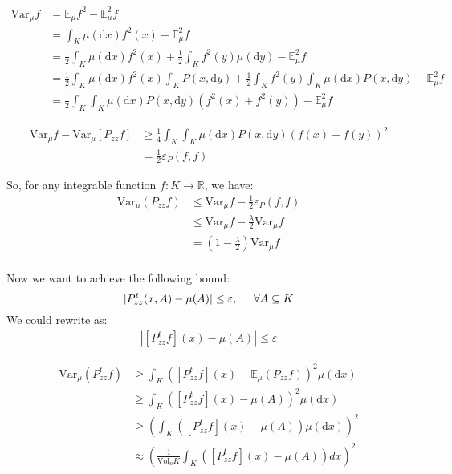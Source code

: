 \documentclass{article}
\begin{document}
\begin{align*}
  \mathrm{Var}_\mu f &= \mathbb{E}_\mu f^2 - \mathbb{E}_\mu^2f \\
  &= \int_K \mu(\mathrm{d}x) f^2(x) - \mathbb{E}_\mu^2f \\
  &= \frac{1}{2}\int_K \mu(\mathrm{d}x) f^2(x) + \frac{1}{2}\int_K f^2(y)\mu(\mathrm{d}y)  - \mathbb{E}_\mu^2f \\
  &= \frac{1}{2}\int_K \mu(\mathrm{d}x) f^2(x)\int_K P(x,\mathrm{d}y) + \frac{1}{2}\int_K f^2(y)\int_K \mu(\mathrm{d}x)P(x,\mathrm{d}y)  - \mathbb{E}_\mu^2f \\
  &= \frac{1}{2} \int_K\int_K \mu(\mathrm{d}x)P(x,\mathrm{d}y)(f^2(x) + f^2(y)) - \mathbb{E}_\mu^2f
\end{align*}

\begin{align*}
  \mathrm{Var}_\mu f - \mathrm{Var}_\mu [P_{zz}f] &\geq \frac{1}{4}\int_K\int_K \mu(\mathrm{d}x) P(x,\mathrm{d}y) (f(x) - f(y))^2 \\
  &= \frac{1}{2} \varepsilon_P(f,f)
\end{align*}

So, for any integrable function $f:K\to\mathbb{R}$, we have:
\begin{align*}
  \mathrm{Var}_\mu(P_{zz}f) &\leq \mathrm{Var}_\mu f - \frac{1}{2}\varepsilon_P(f,f) \\
  &\leq \mathrm{Var}_\mu f - \frac{\lambda}{2}\mathrm{Var}_\mu f \\
  &= (1-\frac{\lambda}{2})\mathrm{Var}_\mu f \\
\end{align*}

Now we want to achieve the following bound:
\[
  |P_{zz}^t(x,A) - \mu(A)| \leq \varepsilon,\hspace{0.5cm} \forall A\subseteq K
\]
We could rewrite as:
\begin{align*}
  |[P_{zz}^tf](x) - \mu(A)| \leq \varepsilon 
\end{align*}

\begin{align*}
  \mathrm{Var}_\mu (P_{zz}^tf) &\geq \int_K ([P_{zz}^tf](x) - \mathbb{E}_\mu (P_{zz}f))^2 \mu(\mathrm{d}x) \\
  &\geq \int_K ([P_{zz}^tf](x) - \mu(A))^2 \mu(\mathrm{d}x) \\
  &\geq (\int_K ([P_{zz}^tf](x) - \mu(A)) \mu(\mathrm{d}x))^2 \\
  &\approx \left(\frac{1}{\mathrm{Vol}_n K} \int_K ([P_{zz}^tf](x) - \mu(A))dx\right)^2
\end{align*}
\fi
\end{document}
